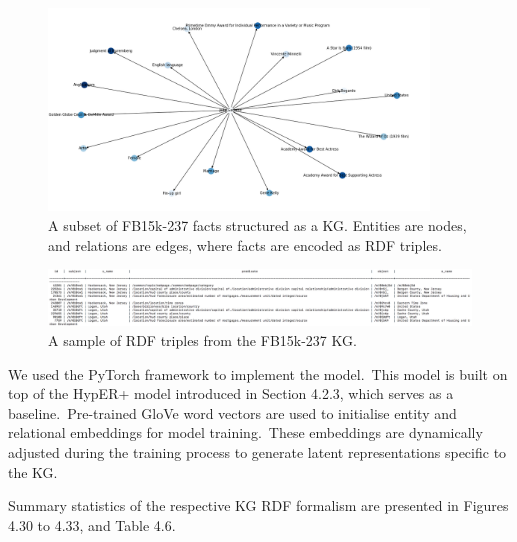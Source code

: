 \begin{figure}
   	\centering
    	\includegraphics[width=0.9\textwidth, height=0.6\textwidth]{FB15k-237_Graph}
	\caption{A subset of FB15k-237 facts structured as a KG. Entities are nodes, and relations are edges, where facts are encoded as RDF triples.}
\end{figure}

\begin{figure}
   	\centering
    	\includegraphics[width=1.0\textwidth, height=0.3\textwidth]{fb15k_237_fact_sample}
	\caption{A sample of RDF triples from the FB15k-237 KG.}
\end{figure}

\noindent We used the PyTorch framework to implement the model.\ This model is built on top of the HypER+ model introduced in Section 4.2.3, which serves as a baseline.\ Pre-trained GloVe word vectors are used to initialise entity and relational embeddings for model training.\ These embeddings are dynamically adjusted during the training process to generate latent representations specific to the KG. \par

\noindent Summary statistics of the respective KG RDF formalism are presented in Figures 4.30 to 4.33, and Table 4.6. 

